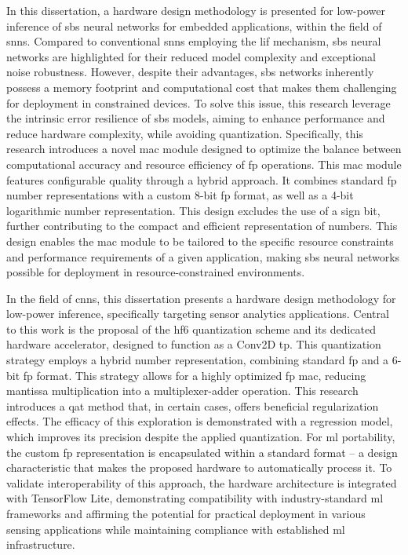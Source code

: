 In this dissertation, a hardware design methodology is presented for low-power inference of \gls{sbs} neural networks for embedded applications, within the field of \glspl{snn}. Compared to conventional \glspl{snn} employing the \gls{lif} mechanism, \gls{sbs} neural networks are highlighted for their reduced model complexity and exceptional noise robustness. However, despite their advantages, \gls{sbs} networks inherently possess a memory footprint and computational cost that makes them challenging for deployment in constrained devices. To solve this issue, this research leverage the intrinsic error resilience of \gls{sbs} models, aiming to enhance performance and reduce hardware complexity, while avoiding quantization. Specifically, this research introduces a novel \gls{mac} module designed to optimize the balance between computational accuracy and resource efficiency of \gls{fp} operations. This \gls{mac} module features configurable quality through a hybrid approach. It combines standard \gls{fp} number representations with a custom 8-bit \gls{fp} format, as well as a 4-bit logarithmic number representation. This design excludes the use of a sign bit, further contributing to the compact and efficient representation of numbers. This design enables the \gls{mac} module to be tailored to the specific resource constraints and performance requirements of a given application, making \gls{sbs} neural networks possible for deployment in resource-constrained environments.

In the field of \glspl{cnn}, this dissertation presents a hardware design methodology for low-power inference, specifically targeting sensor analytics applications. Central to this work is the proposal of the \gls{hf6} quantization scheme and its dedicated hardware accelerator, designed to function as a Conv2D \gls{tp}. This quantization strategy employs a hybrid number representation, combining standard \gls{fp} and a 6-bit \gls{fp} format. This strategy allows for a highly optimized \gls{fp} \gls{mac}, reducing mantissa multiplication into a multiplexer-adder operation. This research introduces a \gls{qat} method that, in certain cases, offers beneficial regularization effects. The efficacy of this exploration is demonstrated with a regression model, which improves its precision despite the applied quantization. For \gls{ml} portability, the custom \gls{fp} representation is encapsulated within a standard format -- a design characteristic that makes the proposed hardware to automatically process it. To validate interoperability of this approach, the hardware architecture is integrated with TensorFlow Lite, demonstrating compatibility with industry-standard \gls{ml} frameworks and affirming the potential for practical deployment in various sensing applications while maintaining compliance with established \gls{ml} infrastructure.



